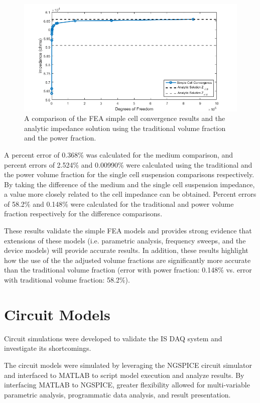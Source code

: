 \begin{figure}[h]
    \centering
    \includegraphics[width=\textwidth]{images/simpleCellValidation.png}
    \caption[Simple Cell validation]{A comparison of the FEA simple cell convergence results and the analytic impedance solution using the traditional volume fraction and the power fraction.}
    \label{fig:simple_cell_validation}
\end{figure}


\par A percent error of 0.368\% was calculated for the medium comparison, and percent errors of 2.524\% and 0.00990\% were calculated using the traditional and the power volume fraction for the single cell suspension comparisons respectively. By taking the difference of the medium and the single cell suspension impedance, a value more closely related to the cell impedance can be obtained. Percent errors of 58.2\% and 0.148\% were calculated for the traditional and power volume fraction respectively for the difference comparisons.

\par These results validate the simple FEA models and provides strong evidence that extensions of these models (i.e. parametric analysis, frequency sweeps, and the device models) will provide accurate results. In addition, these results highlight how the use of the the adjusted volume fractions are significantly more accurate than the traditional volume fraction (error with power fraction: 0.148\% vs. error with traditional volume fraction: 58.2\%). 






\section{Circuit Models}
\par  Circuit simulations were developed to validate the IS DAQ system and investigate its shortcomings.

\par The circuit models were simulated by leveraging the NGSPICE circuit simulator and interfaced to MATLAB to script model execution and analyze results. By interfacing MATLAB to NGSPICE, greater flexibility allowed for multi-variable parametric analysis, programmatic data analysis, and result presentation.


